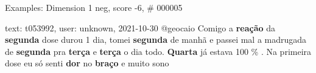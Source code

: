 \begin{frame}{Examples: Dimension 1 neg, score -6, \# 000005}
\footnotesize
\begin{alertblock}{text: t053992, user: unknown, 2021-10-30}
@geocaio Comigo a \textbf{reação} da \textbf{segunda} dose durou 1 dia, tomei 
\textbf{segunda} de manhã e passei mal a madrugada de \textbf{segunda} pra 
\textbf{terça} e \textbf{terça} o dia todo. \textbf{Quarta} já estava 100 \% . 
Na primeira dose eu só senti \textbf{dor} no \textbf{braço} e muito sono 
\end{alertblock}
\end{frame}
